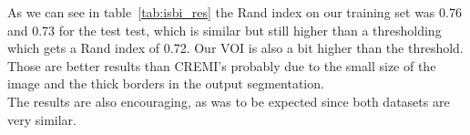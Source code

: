 As we can see in table~\ref{tab:isbi_res} the Rand index on our training set was 0.76 and 0.73 for the test test, 
which is similar but still higher than a thresholding which gets a Rand index of 0.72.
Our VOI is also a bit higher than the threshold.\\
Those are better results than CREMI's probably due to the small size of the
image and the thick borders in the output segmentation.\\ 

The results are also encouraging, as was to be expected since both datasets are
very similar.

